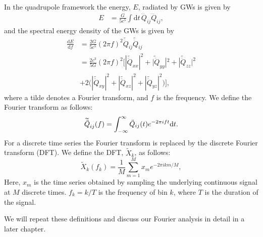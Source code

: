 In the quadrupole framework the energy, $E$, radiated by GWs is given by 
\begin{align} \label{eqT:energy}
E &=\frac{G}{5 c^5} \int \mathrm{d}t \, \dddot{Q}_{ij} \dddot{Q}_{ij},
\end{align}
and the spectral energy density of the GWs is given by 
\begin{align} \label{eqT:dedf}
\frac{\mathrm{d} E}{\mathrm{d} f} &= \frac{2G}{5 c^5} (2\pi f)^2 \widetilde{\ddot{Q}}_{ij} \widetilde{\ddot{Q}}_{ij} \nonumber \\
&=\frac{2 c^3}{5 G} (2\pi f)^2 \bigg[|\widetilde{\ddot{Q}}_{xx}|^2+\widetilde{|\ddot{Q}}_{yy}|^2+|\widetilde{\ddot{Q}}_{zz}|^2 \nonumber \\
&+2\big( |\widetilde{\ddot{Q}}_{xy}|^2 + |\widetilde{\ddot{Q}}_{xz}|^2+|\widetilde{\ddot{Q}}_{yz}|^2 \big)\bigg],
\end{align}
where a tilde denotes a Fourier transform, and $f$ is the
frequency. We define the Fourier transform as follows:
\begin{equation}
\widetilde{\ddot{Q}}_{ij}(f) = \int_{-\infty}^{\infty} \ddot{Q}_{ij}(t) e^{-2 \pi i f t} \mathrm{d} t. 
\end{equation}
For a discrete time series the Fourier transform is replaced by the discrete Fourier transform (DFT).
We define the DFT, $\widetilde{X}_k$, as follows: 
\begin{equation} \label{eq:DFT}
\widetilde{X}_k (f_k) = \frac{1}{M}  \sum^M_{m=1} x_m e^{-2\pi i k m/M},
\end{equation}
Here, $x_m$ is the time series obtained by sampling the underlying continuous signal at $M$ discrete times. 
$f_k = k/T$ is the frequency of bin $k$, where $T$ is the duration of the signal.

We will repeat these definitions and discuss our Fourier analysis in detail in a later chapter. 